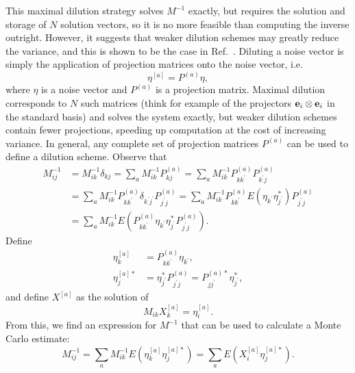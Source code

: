 This maximal dilution strategy solves $M^{-1}$ exactly, but requires the solution and storage of $N$ solution vectors, so it is no more feasible than computing the inverse outright. However, it suggests that weaker dilution schemes may greatly reduce the variance, and this is shown to be the case in Ref.~\cite{Morningstar:2011ka}. Diluting a noise vector is simply the application of projection matrices onto the noise vector, i.e.\
\begin{equation}
    \eta^{[a]} = P^{(a)} \eta,
\end{equation}
where $\eta$ is a noise vector and $P^{(a)}$ is a projection matrix. Maximal dilution corresponds to $N$ such matrices (think for example of the projectors $\vb e_i \otimes \vb e_i$ in the standard basis) and solves the system exactly, but weaker dilution schemes contain fewer projections, speeding up computation at the cost of increasing variance. In general, any complete set of projection matrices $P^{(a)}$ can be used to define a dilution scheme. Observe that
\begin{equation}
\begin{aligned} M_{i j}^{-1} &=M_{i k}^{-1} \delta_{k j}=\sum_{a} M_{i k}^{-1} P_{k j}^{(a)}=\sum_{a} M_{i k}^{-1} P_{k k^{\prime}}^{(a)} P_{k^{\prime} j}^{(a)} \\ &=\sum_{a} M_{i k}^{-1} P_{k k^{\prime}}^{(a)} \delta_{k^{\prime} j^{\prime}} P_{j^{\prime} j}^{(a)}=\sum_{a} M_{i k}^{-1} P_{k k^{\prime}}^{(a)} E\left(\eta_{k^{\prime}} \eta_{j^{\prime}}^{*}\right) P_{j^{\prime} j}^{(a)} \\ &=\sum_{a} M_{i k}^{-1} E\left(P_{k k^{\prime}}^{(a)} \eta_{k^{\prime}} \eta_{j^{\prime}}^{*} P_{j^{\prime} j}^{(a)}\right). \end{aligned}
\end{equation}
Define
\begin{equation}
    \begin{aligned}
    \eta_{k}^{[a]}&=P_{k k^{\prime}}^{(a)} \eta_{k^{\prime}},\\
    \eta_{j}^{[a] *}&=\eta_{j^{\prime}}^{*} P_{j^{\prime} j}^{(a)}=P_{j j^{\prime}}^{(a) *} \eta_{j^{\prime}}^{*},
    \end{aligned}
\end{equation}
and define $X^{[a]}$ as the solution of
\begin{equation}
    M_{i k} X_{k}^{[a]}=\eta_{i}^{[a]}.
\end{equation}
From this, we find an expression for $M^{-1}$ that can be used to calculate a Monte Carlo estimate:
\begin{equation}
    M_{i j}^{-1}=\sum_{a} M_{i k}^{-1} E\left(\eta_{k}^{[a]} \eta_{j}^{[a] *}\right)=\sum_{a} E\left(X_{i}^{[a]} \eta_{j}^{[a] *}\right).
\end{equation}
